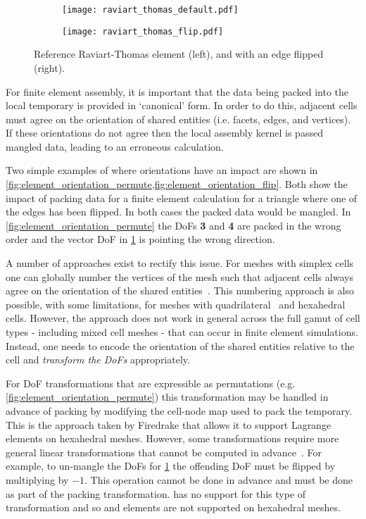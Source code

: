 \documentclass[thesis]{subfiles}
\begin{document}
\begin{figure}
  \centering
  \begin{subfigure}{0.45\textwidth}
    \centering
    \texttt{[image: raviart\_thomas\_default.pdf]}
  \end{subfigure}
  \begin{subfigure}{0.45\textwidth}
    \centering
    \texttt{[image: raviart\_thomas\_flip.pdf]}
  \end{subfigure}
  \caption{Reference Raviart-Thomas element (left), and with an edge flipped (right).}
  \label{fig:element_orientation_flip}
\end{figure}

For finite element assembly, it is important that the data being packed into the local temporary is provided in `canonical' form.
In order to do this, adjacent cells must agree on the orientation of shared entities (i.e. facets, edges, and vertices).
If these orientations do not agree then the local assembly kernel is passed mangled data, leading to an erroneous calculation.

Two simple examples of where orientations have an impact are shown in \cref{fig:element_orientation_permute,fig:element_orientation_flip}.
Both show the impact of packing data for a finite element calculation for a triangle where one of the edges has been flipped.
In both cases the packed data would be mangled.
In \cref{fig:element_orientation_permute} the DoFs \textbf{3} and \textbf{4} are packed in the wrong order and the vector DoF in \cref{fig:element_orientation_flip} is pointing the wrong direction.

A number of approaches exist to rectify this issue.
For meshes with simplex cells one can globally number the vertices of the mesh such that adjacent cells always agree on the orientation of the shared entities~\cite{rognesEfficientAssemblyDiv2010}.
This numbering approach is also possible, with some limitations, for meshes with quadrilateral~\cite{homolyaParallelEdgeOrientation2016} and hexahedral~\cite{agelekOrientingEdgesUnstructured2017} cells.
However, the approach does not work in general across the full gamut of cell types - including mixed cell meshes - that can occur in finite element simulations.
Instead, one needs to encode the orientation of the shared entities relative to the cell and \emph{transform the DoFs} appropriately.

For DoF transformations that are expressible as permutations (e.g. \cref{fig:element_orientation_permute}) this transformation may be handled in advance of packing by modifying the cell-node map used to pack the temporary.
This is the approach taken by Firedrake that allows it to support Lagrange elements on hexahedral meshes.
However, some transformations require more general linear transformations that cannot be computed in advance~\cite{scroggsBasixRuntimeFinite2022,scroggsConstructionArbitraryOrder2021}.
For example, to un-mangle the DoFs for \cref{fig:element_orientation_flip} the offending DoF must be flipped by multiplying by $-1$.
This operation cannot be done in advance and must be done as part of the packing transformation.
 has no support for this type of transformation and so \hdiv and \hcurl elements are not supported on hexahedral meshes.
\end{document}
